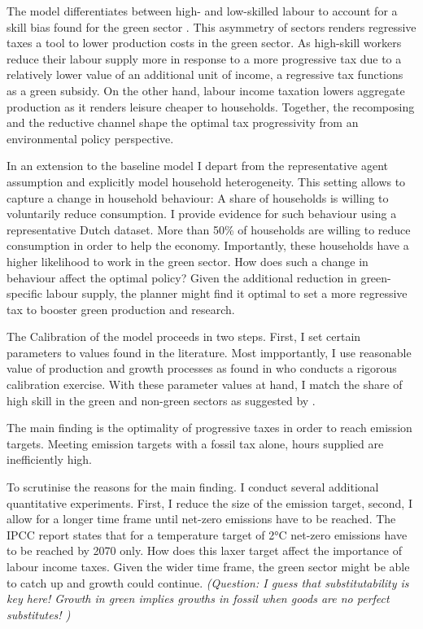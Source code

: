 The model differentiates between high- and low-skilled labour to account for a skill bias found for the green sector \citep{Consoli2016DoCapital}. This asymmetry of sectors renders regressive taxes a tool to lower production costs in the green sector. As high-skill workers reduce their labour supply more in response to a more progressive tax due to a relatively lower value of an additional unit of income, a regressive tax functions as a green subsidy. %
On the other hand, labour income taxation lowers aggregate production as it renders leisure cheaper to households. 
Together, the recomposing and the reductive channel shape the optimal tax progressivity from an environmental policy perspective. 

In an extension to the baseline model I depart from the representative agent assumption and explicitly model household heterogeneity. This setting allows to capture a change in household behaviour: A share of households is willing to voluntarily reduce consumption. I provide evidence for such behaviour using a representative Dutch dataset. More than 50\% of households are willing to reduce consumption in order to help the economy. Importantly, these households have a higher likelihood to work in the green sector. How does such a change in behaviour affect the optimal policy? Given the additional reduction in green-specific labour supply, the planner might find it optimal to set a more regressive tax to booster green production and research.    

The Calibration of the model proceeds in two steps. First, I set certain parameters to values found in the literature. Most impportantly, I use reasonable value of production and growth processes as found in \cite{Fried2018ClimateAnalysis} who conducts a rigorous calibration exercise.  With these parameter values at hand, I match the share of high skill in the green and non-green sectors as suggested by \cite{Consoli2016DoCapital}. 

The main finding is the optimality of progressive taxes in order to reach emission targets. 
Meeting emission targets with a fossil tax alone, hours supplied are inefficiently high. 

To scrutinise the reasons for the main finding. I conduct several additional quantitative experiments. First, I reduce the size of the emission target, second, I allow for a longer time frame until net-zero emissions have to be reached. The IPCC report states that for a temperature target of 2°C net-zero emissions have to be reached by 2070 only. How does this laxer target affect the importance of labour income taxes. Given the wider time frame, the green sector might be able to catch up and growth could continue. \textit{(Question: I guess that substitutability is key here! Growth in green implies growths in fossil when goods are no perfect substitutes! )}